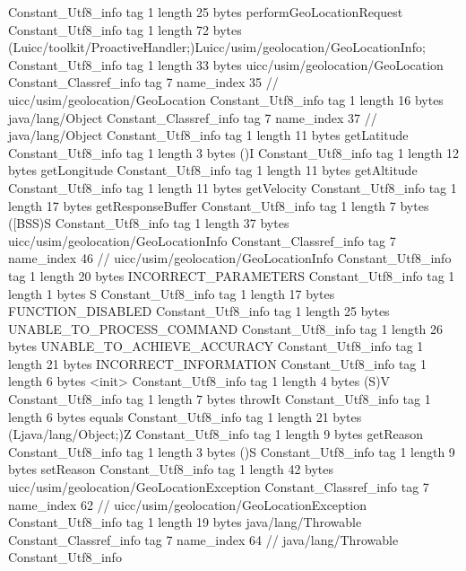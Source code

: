 {{		Constant_Utf8_info {
			tag	1
			length	25
			bytes	performGeoLocationRequest
		}
		Constant_Utf8_info {
			tag	1
			length	72
			bytes	(Luicc/toolkit/ProactiveHandler;)Luicc/usim/geolocation/GeoLocationInfo;
		}
		Constant_Utf8_info {
			tag	1
			length	33
			bytes	uicc/usim/geolocation/GeoLocation
		}
		Constant_Classref_info {
			tag	7
			name_index	35		// uicc/usim/geolocation/GeoLocation
		}
		Constant_Utf8_info {
			tag	1
			length	16
			bytes	java/lang/Object
		}
		Constant_Classref_info {
			tag	7
			name_index	37		// java/lang/Object
		}
		Constant_Utf8_info {
			tag	1
			length	11
			bytes	getLatitude
		}
		Constant_Utf8_info {
			tag	1
			length	3
			bytes	()I
		}
		Constant_Utf8_info {
			tag	1
			length	12
			bytes	getLongitude
		}
		Constant_Utf8_info {
			tag	1
			length	11
			bytes	getAltitude
		}
		Constant_Utf8_info {
			tag	1
			length	11
			bytes	getVelocity
		}
		Constant_Utf8_info {
			tag	1
			length	17
			bytes	getResponseBuffer
		}
		Constant_Utf8_info {
			tag	1
			length	7
			bytes	([BSS)S
		}
		Constant_Utf8_info {
			tag	1
			length	37
			bytes	uicc/usim/geolocation/GeoLocationInfo
		}
		Constant_Classref_info {
			tag	7
			name_index	46		// uicc/usim/geolocation/GeoLocationInfo
		}
		Constant_Utf8_info {
			tag	1
			length	20
			bytes	INCORRECT_PARAMETERS
		}
		Constant_Utf8_info {
			tag	1
			length	1
			bytes	S
		}
		Constant_Utf8_info {
			tag	1
			length	17
			bytes	FUNCTION_DISABLED
		}
		Constant_Utf8_info {
			tag	1
			length	25
			bytes	UNABLE_TO_PROCESS_COMMAND
		}
		Constant_Utf8_info {
			tag	1
			length	26
			bytes	UNABLE_TO_ACHIEVE_ACCURACY
		}
		Constant_Utf8_info {
			tag	1
			length	21
			bytes	INCORRECT_INFORMATION
		}
		Constant_Utf8_info {
			tag	1
			length	6
			bytes	<init>
		}
		Constant_Utf8_info {
			tag	1
			length	4
			bytes	(S)V
		}
		Constant_Utf8_info {
			tag	1
			length	7
			bytes	throwIt
		}
		Constant_Utf8_info {
			tag	1
			length	6
			bytes	equals
		}
		Constant_Utf8_info {
			tag	1
			length	21
			bytes	(Ljava/lang/Object;)Z
		}
		Constant_Utf8_info {
			tag	1
			length	9
			bytes	getReason
		}
		Constant_Utf8_info {
			tag	1
			length	3
			bytes	()S
		}
		Constant_Utf8_info {
			tag	1
			length	9
			bytes	setReason
		}
		Constant_Utf8_info {
			tag	1
			length	42
			bytes	uicc/usim/geolocation/GeoLocationException
		}
		Constant_Classref_info {
			tag	7
			name_index	62		// uicc/usim/geolocation/GeoLocationException
		}
		Constant_Utf8_info {
			tag	1
			length	19
			bytes	java/lang/Throwable
		}
		Constant_Classref_info {
			tag	7
			name_index	64		// java/lang/Throwable
		}
		Constant_Utf8_info {
}}}
